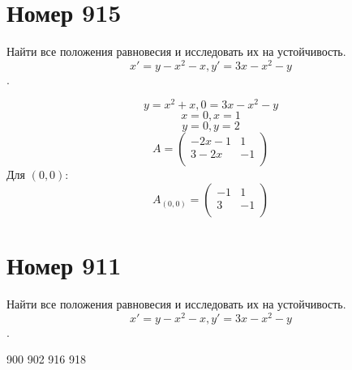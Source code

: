 \section*{Номер 915}
Найти все положения равновесия и исследовать их на устойчивость. $$x' = y - x^2 - x, y' = 3x - x^2 - y$$.
\begin{solution}
    $$ y = x^2 + x, 0 = 3x - x^2 - y $$
    $$ x = 0, x = 1 $$
    $$ y = 0, y = 2 $$
    $$ A = \begin{pmatrix}
        -2x - 1 & 1 \\
        3 - 2x & -1 \\
    \end{pmatrix} $$
    Для $(0, 0)$: $$A_{(0, 0)} = \begin{pmatrix}
        -1 & 1 \\
        3 & -1 \\
    \end{pmatrix}$$

\end{solution}

\section*{Номер 911}
Найти все положения равновесия и исследовать их на устойчивость. $$x' = y - x^2 - x, y' = 3x - x^2 - y$$.
\begin{solution}

    

\end{solution}
900 902 916 918



